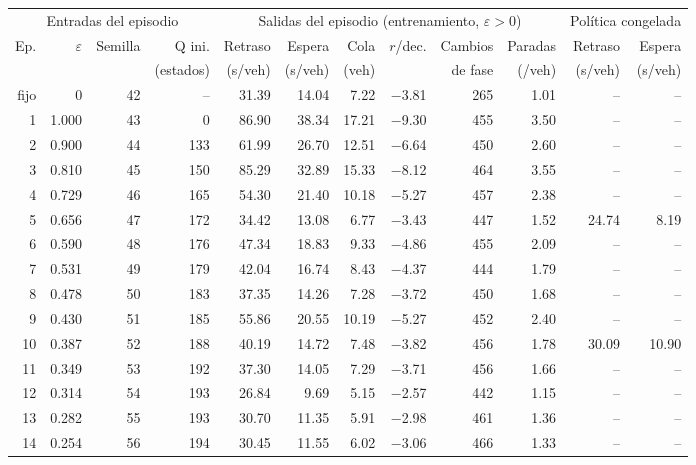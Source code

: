 \begin{table}[H]
\centering
\scriptsize
\setlength{\tabcolsep}{3pt}
\begin{tabular}{rrrrrrrrrrrr}
\toprule
\multicolumn{4}{c}{Entradas del episodio} & \multicolumn{6}{c}{Salidas del episodio (entrenamiento, $\varepsilon>0$)} & \multicolumn{2}{c}{Política congelada} \\
\cmidrule(lr){1-4}\cmidrule(lr){5-10}\cmidrule(lr){11-12}
Ep. & $\varepsilon$ & Semilla & Q ini. & Retraso & Espera & Cola & $r$/dec. & Cambios & Paradas & Retraso & Espera \\
 &  &  & (estados) & (s/veh) & (s/veh) & (veh) &  & de fase & (/veh) & (s/veh) & (s/veh) \\
\midrule
fijo & 0 & 42 & -- & 31.39 & 14.04 & 7.22 & $-$3.81 & 265 & 1.01 & -- & -- \\
\midrule
1 & 1.000 & 43 & 0 & 86.90 & 38.34 & 17.21 & $-$9.30 & 455 & 3.50 & -- & -- \\
2 & 0.900 & 44 & 133 & 61.99 & 26.70 & 12.51 & $-$6.64 & 450 & 2.60 & -- & -- \\
3 & 0.810 & 45 & 150 & 85.29 & 32.89 & 15.33 & $-$8.12 & 464 & 3.55 & -- & -- \\
4 & 0.729 & 46 & 165 & 54.30 & 21.40 & 10.18 & $-$5.27 & 457 & 2.38 & -- & -- \\
5 & 0.656 & 47 & 172 & 34.42 & 13.08 & 6.77 & $-$3.43 & 447 & 1.52 & 24.74 & 8.19 \\
6 & 0.590 & 48 & 176 & 47.34 & 18.83 & 9.33 & $-$4.86 & 455 & 2.09 & -- & -- \\
7 & 0.531 & 49 & 179 & 42.04 & 16.74 & 8.43 & $-$4.37 & 444 & 1.79 & -- & -- \\
8 & 0.478 & 50 & 183 & 37.35 & 14.26 & 7.28 & $-$3.72 & 450 & 1.68 & -- & -- \\
9 & 0.430 & 51 & 185 & 55.86 & 20.55 & 10.19 & $-$5.27 & 452 & 2.40 & -- & -- \\
10 & 0.387 & 52 & 188 & 40.19 & 14.72 & 7.48 & $-$3.82 & 456 & 1.78 & 30.09 & 10.90 \\
11 & 0.349 & 53 & 192 & 37.30 & 14.05 & 7.29 & $-$3.71 & 456 & 1.66 & -- & -- \\
12 & 0.314 & 54 & 193 & 26.84 & 9.69 & 5.15 & $-$2.57 & 442 & 1.15 & -- & -- \\
13 & 0.282 & 55 & 193 & 30.70 & 11.35 & 5.91 & $-$2.98 & 461 & 1.36 & -- & -- \\
14 & 0.254 & 56 & 194 & 30.45 & 11.55 & 6.02 & $-$3.06 & 466 & 1.33 & -- & -- \\

\end{tabular}
\end{table}
